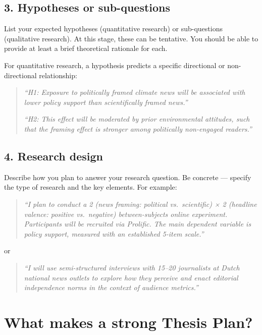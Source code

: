 \documentclass[
  11pt,
  a4paper,
]{scrbook}
\begin{document}
\subsection{3. Hypotheses or
sub-questions}\label{hypotheses-or-sub-questions}

List your expected hypotheses (quantitative research) or sub-questions
(qualitative research). At this stage, these can be tentative. You
should be able to provide at least a brief theoretical rationale for
each.

For quantitative research, a hypothesis predicts a specific directional
or non-directional relationship:

\begin{quote}
\emph{``H1: Exposure to politically framed climate news will be
associated with lower policy support than scientifically framed news.''}

\emph{``H2: This effect will be moderated by prior environmental
attitudes, such that the framing effect is stronger among politically
non-engaged readers.''}
\end{quote}

\subsection{4. Research design}\label{research-design}

Describe how you plan to answer your research question. Be concrete ---
specify the type of research and the key elements. For example:

\begin{quote}
\emph{``I plan to conduct a 2 (news framing: political vs.~scientific) ×
2 (headline valence: positive vs.~negative) between-subjects online
experiment. Participants will be recruited via Prolific. The main
dependent variable is policy support, measured with an established
5-item scale.''}
\end{quote}

or

\begin{quote}
\emph{``I will use semi-structured interviews with 15--20 journalists at
Dutch national news outlets to explore how they perceive and enact
editorial independence norms in the context of audience metrics.''}
\end{quote}

\section{What makes a strong Thesis
Plan?}\label{what-makes-a-strong-thesis-plan}
\end{document}
